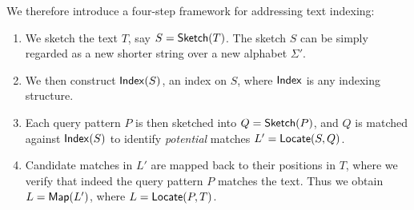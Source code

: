 We therefore introduce a four-step framework for addressing text indexing:
\begin{enumerate}
  \item We sketch the text $T$, say $S=\textup{\textsf{Sketch}}(T)$. The sketch $S$ can be simply regarded as a new shorter string over a new alphabet $\Sigma'$.
  \item We then construct $\textup{\textsf{Index}}(S)$, an index on $S$, where $\textup{\textsf{Index}}$ is any indexing structure.
  \item Each query pattern $P$ is then sketched into $Q=\textup{\textsf{Sketch}}(P)$, and $Q$ is
    matched against $\textup{\textsf{Index}}(S)$ to identify \emph{potential} matches $L' =
    \textup{\textsf{Locate}}(S, Q)$.
  \item Candidate matches in $L'$ are mapped back to their positions in
    $T$, where we verify that indeed the query pattern $P$
    matches the text. Thus we obtain $L=\textup{\textsf{Map}}(L')$, where $L=\textup{\textsf{Locate}}(P,T)$.
\end{enumerate}

